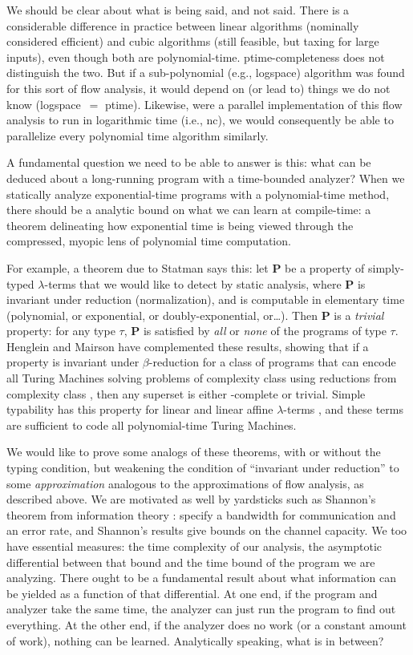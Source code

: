 \documentclass{llncs}
\newcommand\nc{{\sc nc}}
\newcommand\ptime{{\sc ptime}}
\newcommand\logspace{{\sc logspace}}
\begin{document}
We should be clear about what is being said, and not said.  There is a
considerable difference in practice between linear algorithms
(nominally considered efficient) and cubic algorithms (still feasible,
but taxing for large inputs), even though both are polynomial-time.
\ptime-completeness does not distinguish the two.  But if a
sub-polynomial (e.g., \logspace) algorithm was found for this sort of
flow analysis, it would depend on (or lead to) things we do not know
(\logspace\ $=$ \ptime).  Likewise, were a parallel implementation of
this flow analysis to run in logarithmic time (i.e., \nc), we would
consequently be able to parallelize every polynomial time algorithm
similarly.

A fundamental question we need to be able to answer is this: what can
be deduced about a long-running program with a time-bounded analyzer?
When we statically analyze exponential-time programs with a
polynomial-time method, there should be a analytic bound on what we
can learn at compile-time: a theorem delineating how exponential time
is being viewed through the compressed, myopic lens of polynomial time
computation.

For example, a theorem due to Statman \cite{statman} says this: let
{\bf P} be a property of simply-typed $\lambda$-terms that we would
like to detect by static analysis, where {\bf P} is invariant under
reduction (normalization), and is computable in elementary time
(polynomial, or exponential, or doubly-exponential, or\dots).  Then
{\bf P} is a {\em trivial} property: for any type $\tau$, {\bf P} is
satisfied by {\em all} or {\em none} of the programs of type $\tau$.
Henglein and Mairson \cite{henglein-mairson-popl91} have complemented
these results, showing that if a property is invariant under
$\beta$-reduction for a class of programs that can encode all Turing
Machines solving problems of complexity class {} using
reductions from complexity class {}, then any superset is either
{}-complete or trivial.  Simple typability has this property for
linear and linear affine $\lambda$-terms
\cite{henglein-mairson-popl91,mairson-jfp04}, and these terms are
sufficient to code all polynomial-time Turing Machines.

We would like to prove some analogs of these theorems, with or without
the typing condition, but weakening the condition of ``invariant under
reduction'' to some {\em approximation} analogous to the
approximations of flow analysis, as described above.  We are motivated
as well by yardsticks such as Shannon's theorem from information
theory \cite{shannon}: specify a bandwidth for communication and an
error rate, and Shannon's results give bounds on the channel capacity.
We too have essential measures: the time complexity of our analysis,
the asymptotic differential between that bound and the time bound of
the program we are analyzing.  There ought to be a fundamental result
about what information can be yielded as a function of that
differential.  At one end, if the program and analyzer take the same
time, the analyzer can just run the program to find out everything.
At the other end, if the analyzer does no work (or a constant amount
of work), nothing can be learned.  Analytically speaking, what is in
between?
\end{document}
